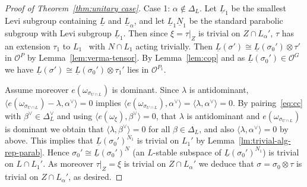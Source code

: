 \documentclass[a4paper]{amsart}
\numberwithin{equation}{section}
\theoremstyle{remark}
\theoremstyle{definition}
\newcommand{\alggrp}[1]{\underline{#1}}
\newcommand{\ang}[1]{\langle #1\rangle}
\begin{document}
\begin{proof}[Proof of Theorem~\ref{thm:unitary case}]
  Case 1: $\alpha \notin \Delta_L$.
  Let $\alggrp L_{1}$ be the smallest Levi subgroup containing $\alggrp L$ and $\alggrp L_{\alpha}$, and let $\alggrp L_1 \alggrp N_1$ be the standard parabolic subgroup with Levi subgroup $\alggrp L_{1}$.
  Then since $\xi = \tau|_{Z}$ is trivial on $Z\cap L_{\alpha}'$, $\tau$ has an extension $\tau_{1}$ to $L_{1}$~\cite[II.7 Proposition]{AHHV} with $N \cap L_1$ acting trivially.
  Then $\underline L(\sigma') \cong \underline L(\sigma_0') \otimes \tau'$ in $\mathcal O^P$ by Lemma~\ref{lem:verma-tensor}.
  By Lemma~\ref{lem:cop} and as $\underline L(\sigma_0') \in \mathcal O^G$ we have $\underline L(\sigma') \cong \underline L(\sigma_0') \otimes \tau_1'$ lies in $\mathcal O^{P_1}$.
  
  Assume moreover $e(\omega_{\sigma_{U\cap L}})$ is dominant.
  Since $\lambda$ is antidominant, $\langle e(\omega_{\sigma_{U\cap L}}) - \lambda,\alpha^{\vee}\rangle = 0$ implies $\langle e(\omega_{\sigma_{U\cap L}}),\alpha^{\vee}\rangle = \langle \lambda,\alpha^{\vee}\rangle = 0$.
  By pairing~\eqref{eq:cc} with $\beta^\vee\in \Delta_{L}^{\vee}$ and using $\langle e(\omega_{\xi}),\beta^{\vee}\rangle = 0$, that $\lambda$ is antidominant and $e(\omega_{\sigma_{U \cap L}})$ is dominant we obtain that $\ang{\lambda,\beta^\vee} = 0$ for all $\beta \in \Delta_L$, and also $\ang{\lambda,\alpha^{\vee}} = 0$ by above.
  This implies that $\underline L(\sigma_0')^{N_1}$ is trivial on $L_1'$ by Lemma~\ref{lm:trivial-alg-rep-parab}.   Hence $\sigma_0' \cong \underline L(\sigma_0')^{N}$ (an $L$-stable subspace of $\underline L(\sigma_0')^{N_1}$) is trivial on $L \cap L_1'$.
  As moreover $\tau|_Z = \xi$ is trivial on $Z \cap L_\alpha'$ we deduce that $\sigma = \sigma_0 \otimes \tau$ is trivial on $Z \cap L_\alpha'$, as desired.


\end{proof}
\end{document}
